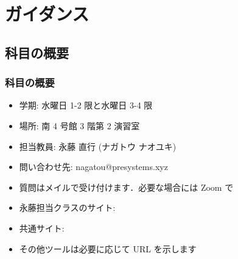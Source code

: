 \section{ガイダンス}
%
%
\subsection{科目の概要}
\begin{frame}
\frametitle{科目の概要}
  \begin{itemize}
\item 学期: 水曜日 1-2 限と水曜日 3-4 限
\item 場所: 南 4 号館 3 階第 2 演習室
\item 担当教員: 永藤 直行 (ナガトウ ナオユキ)
\item 問い合わせ先: nagatou@presystems.xyz
\item 質問はメイルで受け付けます．必要な場合には Zoom で
\item 永藤担当クラスのサイト: \href{https://sites.google.com/presystems.xyz/elementarycs/top}{} 
\item 共通サイト: \href{https://wakita.github.io/classes/years/y22/cs1/course.html}{}
\item その他ツールは必要に応じて URL を示します
  \end{itemize}
\end{frame}
%
%
